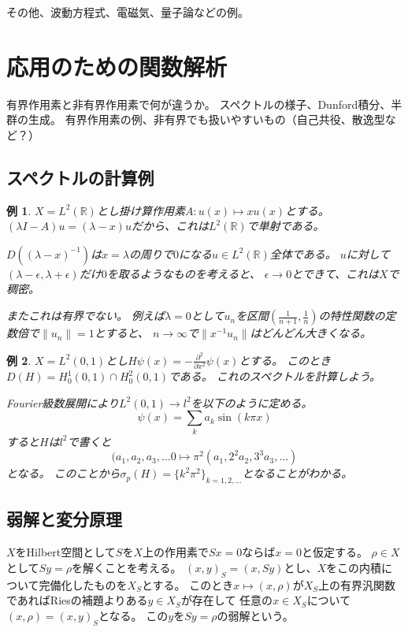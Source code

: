 \documentclass{jsarticle}
\newtheorem{eg}{例}
\newcommand{\R}{\mathbb{R}}
\newcommand{\norm}[1]{\|#1\|}
\begin{document}
その他、波動方程式、電磁気、量子論などの例。

\section{応用のための関数解析}
有界作用素と非有界作用素で何が違うか。
スペクトルの様子、Dunford積分、半群の生成。
有界作用素の例、非有界でも扱いやすいもの（自己共役、散逸型など？）

\subsection{スペクトルの計算例}
\begin{eg}
$X=L^2(\R)$とし掛け算作用素$A\colon u(x)\mapsto xu(x)$とする。
$(\lambda I-A)u=(\lambda-x)u$だから、これは$L^2(\R)$で単射である。

$D((\lambda-x)^{-1})$は$x=\lambda$の周りで$0$になる$u\in L^2(\R)$全体である。
$u$に対して$(\lambda-\epsilon,\lambda+\epsilon)$だけ$0$を取るようなものを考えると、
$\epsilon\to 0$とできて、これは$X$で稠密。

またこれは有界でない。
例えば$\lambda=0$として$u_n$を区間$(\frac{1}{n+1},\frac{1}{n})$の特性関数の定数倍で$\norm{u_n}=1$とすると、
$n\to\infty$で$\norm{x^{-1}u_n}$はどんどん大きくなる。
\end{eg}

\begin{eg}
$X=L^2(0,1)$とし$H\psi(x)=-\frac{\partial^2}{\partial x^2}\psi(x)$とする。
このとき$D(H)=H^1_0(0,1)\cap H^2_0(0,1)$である。
これのスペクトルを計算しよう。

Fourier級数展開により$L^2(0,1)\to l^2$を以下のように定める。
\[
\psi(x)=\sum_k a_k\sin(k\pi x)
\]
すると$H$は$l^2$で書くと
\[
(a_1,a_2,a_3,\ldots0\mapsto\pi^2(a_1,2^2a_2,3^3a_3,\ldots)
\]
となる。
このことから$\sigma_p(H)=\{k^2\pi^2\}_{k=1,2,\ldots}$となることがわかる。
\end{eg}

\subsection{弱解と変分原理}
$X$をHilbert空間として$S$を$X$上の作用素で$Sx=0$ならば$x=0$と仮定する。
$\rho\in X$として$Sy=\rho$を解くことを考える。
$(x,y)_S=(x,Sy)$とし、$X$をこの内積について完備化したものを$X_S$とする。
このとき$x\mapsto(x,\rho)$が$X_S$上の有界汎関数であればRiesの補題よりある$y\in X_S$が存在して
任意の$x\in X_S$について$(x,\rho)=(x,y)_S$となる。
この$y$を$Sy=\rho$の弱解という。
\end{document}
